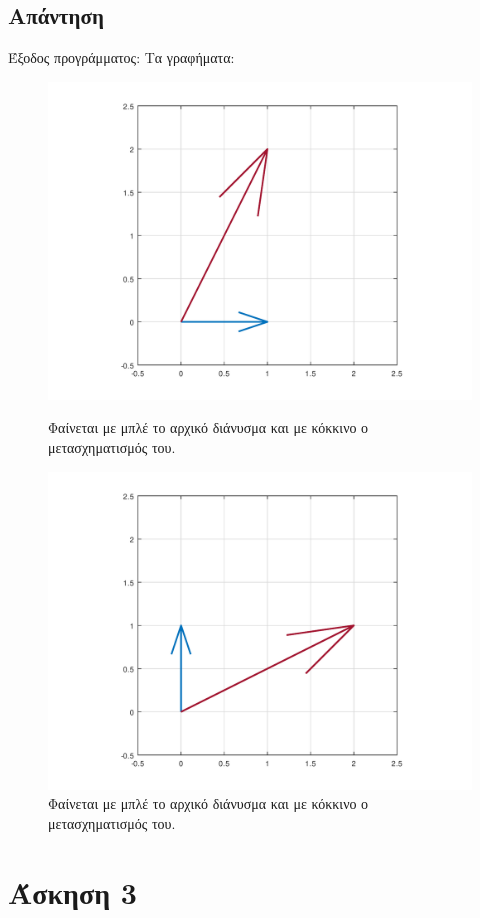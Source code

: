 \documentclass[a4paper,12pt]{article}
\begin{document}
\subsection{Απάντηση}
Έξοδος προγράμματος:
Τα γραφήματα:
\begin{figure}
	\centering
	\includegraphics[scale=0.6]{x1.png}
	\caption{Φαίνεται με μπλέ το αρχικό διάνυσμα και με κόκκινο ο μετασχηματισμός του.}
	\includegraphics[scale=0.6]{x2.png}
	\caption{Φαίνεται με μπλέ το αρχικό διάνυσμα και με κόκκινο ο μετασχηματισμός του.}
\end{figure}
\newpage\section{Άσκηση 3}
\end{document}
